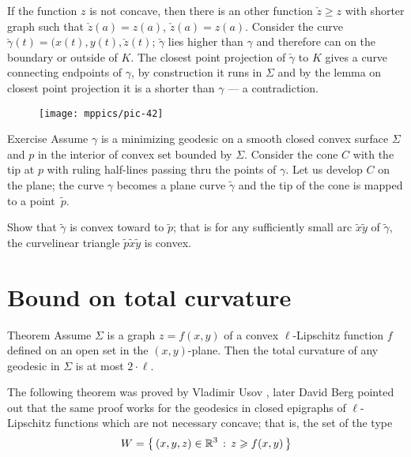 If the function $z$ is not concave, then there is an other function $\check z\ge z$ with shorter graph such that $\check z(a)=z(a)$, $\check z(a)=z(a)$.
Consider the curve $\check\gamma(t)=(x(t),y(t),\check z(t)$;
$\check\gamma$ lies higher than $\gamma$ and therefore can on the boundary or outside of $K$.
The closest point projection of $\check \gamma$ to $K$ gives a curve connecting endpoints of $\gamma$, by construction it runs in $\Sigma$ and by the lemma on closest point projection it is a shorter than $\gamma$ --- a contradiction. 
\qeds

\begin{wrapfigure}{o}{30 mm}
\vskip-4mm
\centering
\texttt{[image: mppics/pic-42]}
\vskip-0mm
\end{wrapfigure}

\begin{thm}{Exercise}
Assume $\gamma$ is a minimizing geodesic on a smooth closed convex surface $\Sigma$ and $p$ in the interior of convex set bounded by $\Sigma$.
Consider the cone $C$ with the tip at $p$ with ruling half-lines passing thru the points of $\gamma$.
Let us develop $C$ on the plane; the curve $\gamma$ becomes a plane curve $\tilde\gamma$ and the tip of the cone is mapped to a point~$\tilde p$.

Show that $\tilde\gamma$ is convex toward to $\tilde p$; that is for any sufficiently small arc $\tilde x\tilde y$ of $\tilde\gamma$, the curvelinear triangle $\tilde p\tilde x\tilde y$ is convex. 
\end{thm}



\section{Bound on total curvature}




\begin{thm}{Theorem}\label{thm:usov}
Assume $\Sigma$ is a graph $z=f(x,y)$ of a convex $\ell$-Lipschitz function $f$ defined on an open set in the $(x,y)$-plane.
Then the total curvature of any geodesic in $\Sigma$ is at most $2\cdot \ell$.
\end{thm}

The following theorem was proved by Vladimir Usov \cite{usov},
later David Berg \cite{berg} pointed out that the same proof works for the geodesics in closed epigraphs of $\ell$-Lipschitz functions which are not necessary concave; that is, the set of the type 
\[W=\left\{\,{(x,y,z)\in\mathbb{R}^3}\,:\,{z\geqslant f(x,y)}\,\right\}\]



